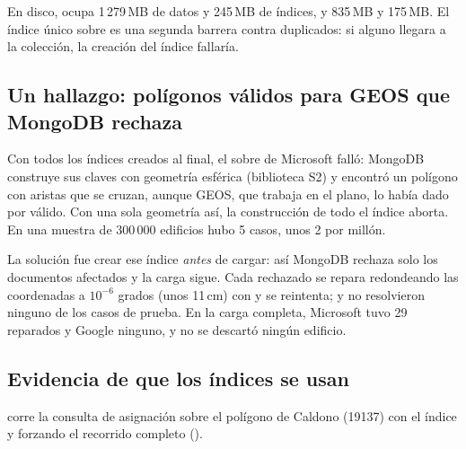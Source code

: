 En disco,  ocupa 1\,279\,MB de datos y 245\,MB de
índices, y  835\,MB y 175\,MB. El índice único
sobre  es una segunda barrera contra duplicados: si alguno
llegara a la colección, la creación del índice fallaría.

\subsection{Un hallazgo: polígonos válidos para GEOS que MongoDB rechaza}
\label{sec:s2}

Con todos los índices creados al final, el  sobre
 de Microsoft falló: MongoDB construye sus claves con geometría
esférica (biblioteca S2) y encontró un polígono con aristas que se cruzan,
aunque GEOS, que trabaja en el plano, lo había dado por válido. Con una sola
geometría así, la construcción de todo el índice aborta. En una muestra de
300\,000 edificios hubo 5 casos, unos 2 por millón.

La solución fue crear ese índice \emph{antes} de cargar: así MongoDB rechaza
solo los documentos afectados y la carga sigue. Cada rechazado se repara
redondeando las coordenadas a $10^{-6}$ grados (unos 11\,cm) con
 y se reintenta;  y
 no resolvieron ninguno de los casos de prueba. En la carga
completa, Microsoft tuvo 29 reparados y Google ninguno, y no se descartó ningún
edificio.

\subsection{Evidencia de que los índices se usan}
\label{sec:evidencia-edif}

 corre la consulta de asignación sobre el polígono de
Caldono (19137) con el índice y forzando el recorrido completo
().

